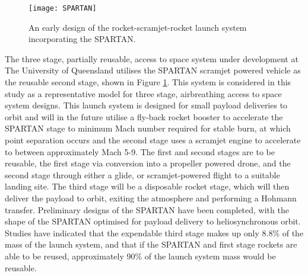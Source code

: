 \begin{figure}[ht]
	\centering
	\texttt{[image: SPARTAN]}
	\caption{An early design of the rocket-scramjet-rocket launch system incorporating the SPARTAN\cite{Jazra2013}.}
	\label{fig:SPARTAN}
\end{figure}
The three stage, partially reusable, access to space system under development at The University of Queensland utilises the SPARTAN\cite{Jazra2013} scramjet powered vehicle as the reusable second stage, shown in Figure \ref{fig:SPARTAN}. This system is considered in this study as a representative model for three stage, airbreathing access to space system designs. This launch system is designed for small payload deliveries to orbit and will in the future utilise a fly-back rocket booster to accelerate the SPARTAN stage to minimum Mach number required for stable burn, at which point separation occurs and the second stage uses a scramjet engine to accelerate to between approximately Mach 5-9. The first and second stages are to be reusable, the first stage via conversion into a propeller powered drone, and the second stage through either a glide, or scramjet-powered flight to a suitable landing site.
The third stage will be a disposable rocket stage, which will then deliver the payload to orbit, exiting the atmosphere and performing a Hohmann transfer. 
Preliminary designs of the SPARTAN have been completed, with the shape of the SPARTAN optimised for payload delivery to heliosynchronous orbit.
Studies have indicated that the expendable third stage makes up only 8.8\% of the mass of the launch system, and that if the SPARTAN and first stage rockets are able to be reused, approximately 90\% of the launch system mass would be reusable\cite{Preller2017b}.

